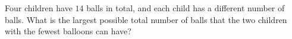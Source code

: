 Four children have $14$ balls in total, and each child has a different number of balls. What is the largest possible total number of balls that the two children with the fewest balloons can have?

